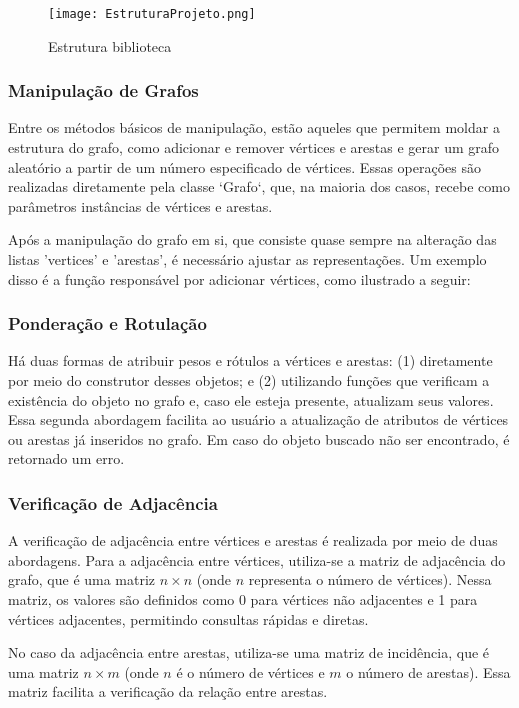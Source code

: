 \documentclass[12pt]{article}
\begin{document}
\begin{figure}[ht]
\centering
\texttt{[image: EstruturaProjeto.png]}
\caption{Estrutura biblioteca}
\label{fig:exampleFig1}
\end{figure}

\subsubsection{Manipulação de Grafos}

Entre os métodos básicos de manipulação, estão aqueles que permitem moldar a estrutura do grafo, como adicionar e remover vértices e arestas e gerar um grafo aleatório a partir de um número especificado de vértices. Essas operações são realizadas diretamente pela classe `Grafo`, que, na maioria dos casos, recebe como parâmetros instâncias de vértices e arestas. 

Após a manipulação do grafo em si, que consiste quase sempre na alteração das listas 'vertices' e 'arestas', é necessário ajustar as representações. Um exemplo disso é a função responsável por adicionar vértices, como ilustrado a seguir:

\subsubsection{Ponderação e Rotulação}

Há duas formas de atribuir pesos e rótulos a vértices e arestas: (1) diretamente por meio do construtor desses objetos; e (2) utilizando funções que verificam a existência do objeto no grafo e, caso ele esteja presente, atualizam seus valores. Essa segunda abordagem facilita ao usuário a atualização de atributos de vértices ou arestas já inseridos no grafo. Em caso do objeto buscado não ser encontrado, é retornado um erro.

\subsubsection{Verificação de Adjacência}

A verificação de adjacência entre vértices e arestas é realizada por meio de duas abordagens. Para a adjacência entre vértices, utiliza-se a matriz de adjacência do grafo, que é uma matriz \(n \times n\) (onde \(n\) representa o número de vértices). Nessa matriz, os valores são definidos como 0 para vértices não adjacentes e 1 para vértices adjacentes, permitindo consultas rápidas e diretas.

No caso da adjacência entre arestas, utiliza-se uma matriz de incidência, que é uma matriz \(n \times m\) (onde \(n\) é o número de vértices e \(m\) o número de arestas). Essa matriz facilita a verificação da relação entre arestas.
\end{document}
